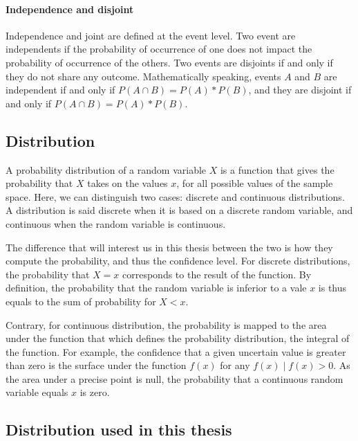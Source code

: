 \paragraph{Independence and disjoint}
Independence and joint are defined at the event level.
Two event are independents if the probability of occurrence of one does not impact the probability of occurrence of the others.
Two events are disjoints if and only if they do not share any outcome.
Mathematically speaking, events $A$ and $B$ are independent if and only if $P(A \cap B) = P(A) * P(B)$, and they are disjoint if and only if $P(A \cap B) = P(A) * P(B)$.

\subsection{Distribution}
A probability distribution of a random variable $X$ is a function that gives the probability that $X$ takes on the values $x$, for all possible values of the sample space.
Here, we can distinguish two cases: discrete and continuous distributions.
A distribution is said discrete when it is based on a discrete random variable, and continuous when the random variable is continuous.

The difference that will interest us in this thesis between the two is how they compute the probability, and thus the confidence level.
For discrete distributions, the probability that $X=x$ corresponds to the result of the function.
By definition, the probability that the random variable is inferior to a vale $x$ is thus equals to the sum of probability for $X < x$.

Contrary, for continuous distribution, the probability is mapped to the area under the function that which defines the probability distribution, \ie the integral of the function.
For example, the confidence that a given uncertain value is greater than zero is the surface under the function $f(x)$ for any $f(x) \mid f(x) > 0$. 
As the area under a precise point is null, the probability that a continuous random variable equals $x$ is zero.


\subsection{Distribution used in this thesis}


